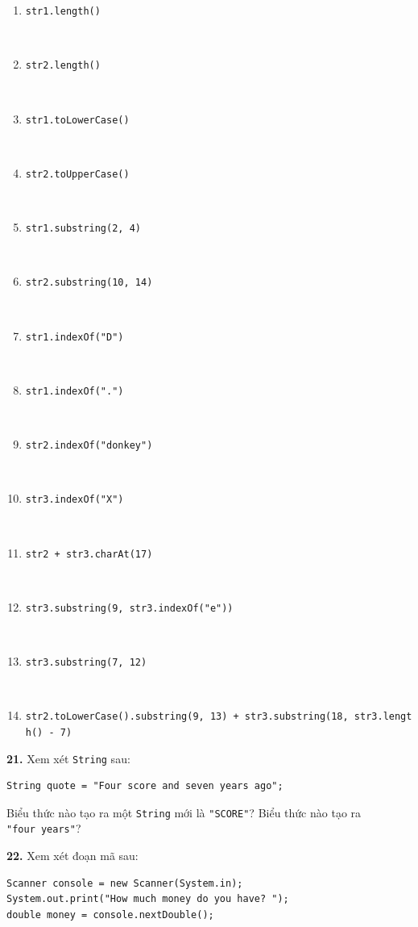 \begin{enumerate}
\def\labelenumi{\alph{enumi}.}
\tightlist
\item
  \texttt{str1.length()}\strut \\
\item
  \texttt{str2.length()}\strut \\
\item
  \texttt{str1.toLowerCase()}\strut \\
\item
  \texttt{str2.toUpperCase()}\strut \\
\item
  \texttt{str1.substring(2,\ 4)}\strut \\
\item
  \texttt{str2.substring(10,\ 14)}\strut \\
\item
  \texttt{str1.indexOf("D")}\strut \\
\item
  \texttt{str1.indexOf(".")}\strut \\
\item
  \texttt{str2.indexOf("donkey")}\strut \\
\item
  \texttt{str3.indexOf("X")}\strut \\
\item
  \texttt{str2\ +\ str3.charAt(17)}\strut \\
\item
  \texttt{str3.substring(9,\ str3.indexOf("e"))}\strut \\
\item
  \texttt{str3.substring(7,\ 12)}\strut \\
\item
  \texttt{str2.toLowerCase().substring(9,\ 13)\ +\ str3.substring(18,\ str3.length()\ -\ 7)}
\end{enumerate}

\textbf{21.} Xem xét \texttt{String} sau:

\begin{verbatim}
String quote = "Four score and seven years ago";
\end{verbatim}

Biểu thức nào tạo ra một \texttt{String} mới là \texttt{"SCORE"}? Biểu
thức nào tạo ra \texttt{"four\ years"}?

\textbf{22.} Xem xét đoạn mã sau:

\begin{verbatim}
Scanner console = new Scanner(System.in);
System.out.print("How much money do you have? ");
double money = console.nextDouble();
\end{verbatim}

